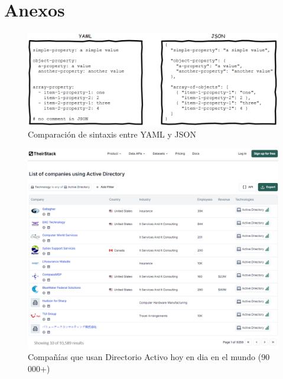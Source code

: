 \section*{Anexos}

\begin{figure}[h]
    \centering
    \includegraphics[width=\linewidth]{images/yaml-vs-json.png}
    \caption{Comparación de sintaxis entre YAML y JSON}
    \label{fig:yaml-vs-json}
\end{figure}
\newpage
{}
\begin{landscape}
    \begin{figure}
        \centering
        \includegraphics[width=\linewidth]{images/companies using ad - 2 .png}
        \caption{Compañías que usan Directorio Activo hoy en dia en el mundo (90 000+)}
        \label{fig:companies_using_ad}
    \end{figure}
\end{landscape}
\restoregeometry